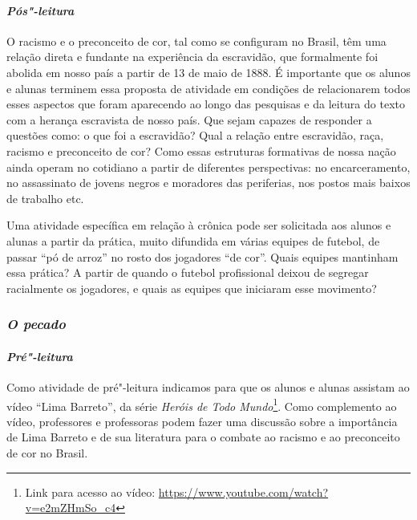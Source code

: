 \documentclass[11pt]{extarticle}
\begin{document}
{{


\paragraph{\textit{Pós"-leitura}}

O racismo e o preconceito de cor, tal como se configuram no Brasil,
têm uma relação direta e fundante na experiência da escravidão, que
formalmente foi abolida em nosso país a partir de 13 de maio de 1888.
É importante que os alunos e alunas terminem essa proposta de atividade em
condições de relacionarem todos esses aspectos que foram aparecendo ao
longo das pesquisas e da leitura do texto com a herança escravista de
nosso país. Que sejam capazes de responder a questões como: o que foi a
escravidão? Qual a relação entre escravidão, raça, racismo e preconceito
de cor? Como essas estruturas formativas de nossa nação ainda operam no
cotidiano a partir de diferentes perspectivas: no encarceramento, no
assassinato de jovens negros e moradores das periferias, nos postos mais
baixos de trabalho etc.

Uma atividade específica em relação à crônica pode ser solicitada aos
alunos e alunas a partir da prática, muito difundida em várias equipes 
de futebol, de passar ``pó de arroz'' no rosto dos jogadores
``de cor''. Quais equipes mantinham essa prática? A partir de quando o
futebol profissional deixou de segregar racialmente os jogadores, e quais
as equipes que iniciaram esse movimento?


\subsubsection{\textit{O pecado}}

\paragraph{\textit{Pré"-leitura}}

Como atividade de pré"-leitura indicamos para que os alunos e alunas
assistam ao vídeo ``Lima Barreto'', da série \emph{Heróis de Todo
Mundo}\footnote{Link para acesso ao vídeo:
  \url{https://www.youtube.com/watch?v=e2mZHmSo_c4}}. Como complemento
ao vídeo, professores e professoras podem fazer uma discussão sobre a
importância de Lima Barreto e de sua literatura para o combate ao
racismo e ao preconceito de cor no Brasil.

}}
\end{document}
